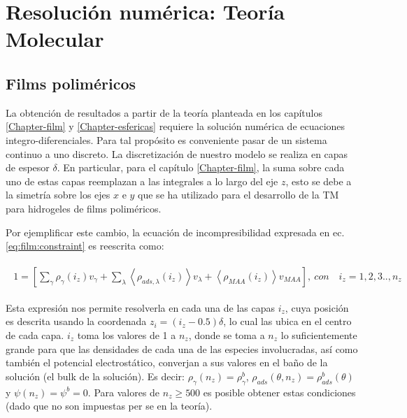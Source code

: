 \chapter{Resoluci\'on num\'erica: Teor\'ia Molecular}\label{sec:film:reso-numerica}


\section{Films polim\'ericos}

La obtenci\'on de resultados a partir de la teor\'ia planteada en los cap\'itulos \ref{Chapter-film} y \ref{Chapter-esfericas} requiere la soluci\'on num\'erica de ecuaciones integro-diferenciales. Para tal prop\'osito es conveniente pasar de un sistema continuo a uno discreto. 
La discretizaci\'on de nuestro modelo se realiza en capas de espesor $\delta$. 
En particular, para el cap\'itulo \ref{Chapter-film}, la suma sobre cada uno de estas capas reemplazan a las integrales a lo largo del eje $z$, esto se debe a la simetr\'ia sobre los ejes $x$ e $y$ que se ha utilizado para el desarrollo de la TM para hidrogeles de films polim\'ericos.

Por ejemplificar este cambio, la ecuaci\'on de incompresibilidad expresada en ec. \ref{eq:film:constraint} es reescrita como:


\begin{align}
	\begin{aligned}
		1=  {\left[\sum_{\gamma}\rho_\gamma(i_z) v_\gamma + \sum_\lambda{\left<\rho_{ads,\lambda}(i_z)\right>v_\lambda} + \left<\rho_{MAA}(i_z)\right>v_{MAA} \right]},~ con \quad  i_z =1,2,3.., n_z
	\end{aligned}
	\label{eq:film:discreto-constraint}
\end{align}

Esta expresi\'on nos permite resolverla en cada una de las capas $i_z$, cuya posici\'on es descrita usando la coordenada $z_i = (i_z -0.5)\delta$, lo cual las ubica en el centro de cada capa. $i_z$ toma los valores de 1 a $n_z$, donde se toma a $n_z$ lo suficientemente grande para que las densidades de cada una de las especies involucradas, as\'i como tambi\'en el potencial electrost\'atico, converjan a sus valores en el ba\~no de la soluci\'on (el bulk de la soluci\'on).
Es decir: $\rho_\gamma(n_z) = \rho^b_\gamma$, $\rho_{ads}(\theta,n_z) = \rho^b_{ads}(\theta)$ y $\psi(n_z) = \psi^b =0$.
Para valores de $n_z \geq 500$ es posible obtener estas condiciones (dado que no son impuestas per se en la teor\'ia).

